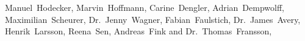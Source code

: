 Manuel~Hodecker,
Marvin~Hoffmann,
Carine~Dengler,
Adrian~Dempwolff,
Maximilian~Scheurer,
Dr.~Jenny~Wagner,
Fabian~Faulstich,
Dr.~James~Avery,
Henrik~Larsson,
Reena~Sen,
Andreas~Fink and
Dr.~Thomas~Fransson,